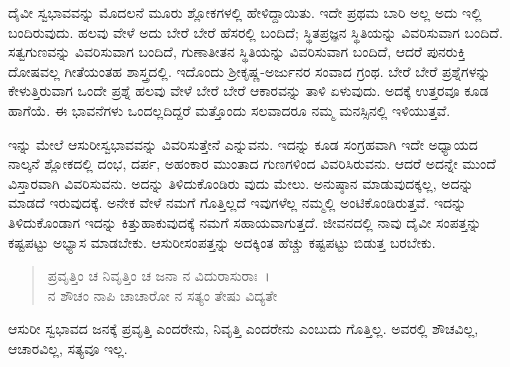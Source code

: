 ದೈವೀ ಸ್ವಭಾವವನ್ನು ಮೊದಲನೆ ಮೂರು ಶ್ಲೋಕಗಳಲ್ಲಿ ಹೇಳಿದ್ದಾಯಿತು. ಇದೇ ಪ್ರಥಮ ಬಾರಿ ಅಲ್ಲ ಅದು ಇಲ್ಲಿ ಬಂದಿರುವುದು. ಹಲವು ವೇಳೆ ಅದು ಬೇರೆ ಬೇರೆ ಹೆಸರಲ್ಲಿ ಬಂದಿದೆ; ಸ್ಥಿತಪ್ರಜ್ಞನ ಸ್ಥಿತಿಯನ್ನು ವಿವರಿಸುವಾಗ ಬಂದಿದೆ. ಸತ್ವಗುಣವನ್ನು ವಿವರಿಸುವಾಗ ಬಂದಿದೆ, ಗುಣಾತೀತನ ಸ್ಥಿತಿಯನ್ನು ವಿವರಿಸುವಾಗ ಬಂದಿದೆ, ಆದರೆ ಪುನರುಕ್ತಿ ದೋಷವಲ್ಲ ಗೀತೆಯಂತಹ ಶಾಸ್ತ್ರದಲ್ಲಿ. ಇದೊಂದು ಶ‍್ರೀಕೃಷ್ಣ-ಅರ್ಜುನರ ಸಂವಾದ ಗ್ರಂಥ. ಬೇರೆ ಬೇರೆ ಪ್ರಶ್ನೆಗಳನ್ನು ಕೇಳುತ್ತಿರುವಾಗ ಒಂದೇ ಪ್ರಶ್ನೆ ಹಲವು ವೇಳೆ ಬೇರೆ ಬೇರೆ ಆಕಾರವನ್ನು ತಾಳಿ ಏಳುವುದು. ಅದಕ್ಕೆ ಉತ್ತರವೂ ಕೂಡ ಹಾಗೆಯೆ. ಈ ಭಾವನೆಗಳು ಒಂದಲ್ಲದಿದ್ದರೆ ಮತ್ತೊಂದು ಸಲವಾದರೂ ನಮ್ಮ ಮನಸ್ಸಿನಲ್ಲಿ ಇಳಿಯುತ್ತವೆ.

ಇನ್ನು ಮೇಲೆ ಆಸುರೀಸ್ವಭಾವವನ್ನು ವಿವರಿಸುತ್ತೇನೆ ಎನ್ನುವನು. ಇದನ್ನು ಕೂಡ ಸಂಗ್ರಹವಾಗಿ ಇದೇ ಅಧ್ಯಾಯದ ನಾಲ್ಕನೆ ಶ್ಲೋಕದಲ್ಲಿ ದಂಭ, ದರ್ಪ, ಅಹಂಕಾರ ಮುಂತಾದ ಗುಣಗಳಿಂದ ವಿವರಿಸಿರುವನು. ಆದರೆ ಅದನ್ನೇ ಮುಂದೆ ವಿಸ್ತಾರವಾಗಿ ವಿವರಿಸುವನು. ಅದನ್ನು ತಿಳಿದುಕೊಂಡಿರು ವುದು ಮೇಲು. ಅನುಷ್ಠಾನ ಮಾಡುವುದಕ್ಕಲ್ಲ, ಅದನ್ನು ಮಾಡದೆ ಇರುವುದಕ್ಕೆ. ಅನೇಕ ವೇಳೆ ನಮಗೆ ಗೊತ್ತಿಲ್ಲದೆ ಇವುಗಳೆಲ್ಲ ನಮ್ಮಲ್ಲಿ ಅಂಟಿಕೊಂಡಿರುತ್ತವೆ. ಇದನ್ನು ತಿಳಿದುಕೊಂಡಾಗ ಇದನ್ನು ಕಿತ್ತುಹಾಕುವುದಕ್ಕೆ ನಮಗೆ ಸಹಾಯವಾಗುತ್ತದೆ. ಜೀವನದಲ್ಲಿ ನಾವು ದೈವೀ ಸಂಪತ್ತನ್ನು ಕಷ್ಟಪಟ್ಟು ಅಭ್ಯಾಸ ಮಾಡಬೇಕು. ಆಸುರೀಸಂಪತ್ತನ್ನು ಅದಕ್ಕಿಂತ ಹೆಚ್ಚು ಕಷ್ಟಪಟ್ಟು ಬಿಡುತ್ತ ಬರಬೇಕು.

\begin{verse}
ಪ್ರವೃತ್ತಿಂ ಚ ನಿವೃತ್ತಿಂ ಚ ಜನಾ ನ ವಿದುರಾಸುರಾಃ~।\\ನ ಶೌಚಂ ನಾಪಿ ಚಾಚಾರೋ ನ ಸತ್ಯಂ ತೇಷು ವಿದ್ಯತೇ 
\end{verse}

{\small ಆಸುರೀ ಸ್ವಭಾವದ ಜನಕ್ಕೆ ಪ್ರವೃತ್ತಿ ಎಂದರೇನು, ನಿವೃತ್ತಿ ಎಂದರೇನು ಎಂಬುದು ಗೊತ್ತಿಲ್ಲ. ಅವರಲ್ಲಿ ಶೌಚವಿಲ್ಲ, ಆಚಾರವಿಲ್ಲ, ಸತ್ಯವೂ ಇಲ್ಲ.}

